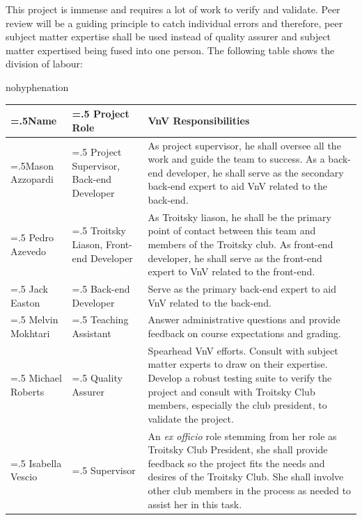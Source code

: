 \documentclass[12pt, titlepage]{article}
\begin{document}
This project is immense and requires a lot of work to verify and validate. 
Peer review will be a guiding principle to catch individual errors and therefore, peer subject matter expertise shall
be used instead of quality assurer and subject matter expertised being fused into one person.
 The following table shows the division of labour:

\begin{center}
  \begin{hyphenrules}{nohyphenation}
    \begin{tabularx}{\linewidth} {
    |>{\hsize=.5\hsize}X|%
    >{\hsize=.5\hsize}X|%
    >{\hsize=2\hsize}X|%
  }
\hline
Name & Project Role & VnV Responsibilities \\
 \hline
Mason Azzopardi & Project Supervisor, Back-end Developer & As project supervisor, he shall oversee all the work and guide the team to success. As a back-end developer, he shall serve as the secondary back-end expert to aid VnV related to the back-end.  \\ 
\hline
Pedro Azevedo & Troitsky Liason, Front-end Developer & As Troitsky liason, he shall be the primary point of contact between this team and members of the Troitsky club. As front-end developer, he shall serve as the front-end expert to VnV related to the front-end.   \\ 
\hline
Jack Easton & Back-end Developer & Serve as the primary back-end expert to aid VnV related to the back-end. \\
\hline
Melvin Mokhtari & Teaching Assistant & Answer administrative questions and provide feedback on course expectations and grading. \\
\hline
Michael Roberts & Quality Assurer & Spearhead VnV efforts. Consult with subject matter experts to draw on their expertise. Develop a robust testing suite to verify the project and consult with Troitsky Club members, especially the club president, to validate the project. \\
\hline
Isabella Vescio & Supervisor & An \textit{ex officio} role stemming from her role as Troitsky Club President, she shall provide feedback so the project fits the needs and desires of the Troitsky Club. She shall involve other club members in the process as needed to assist her in this task.  \\
 \hline
\end{tabularx}
  \end{hyphenrules}

\end{center}
\end{document}
